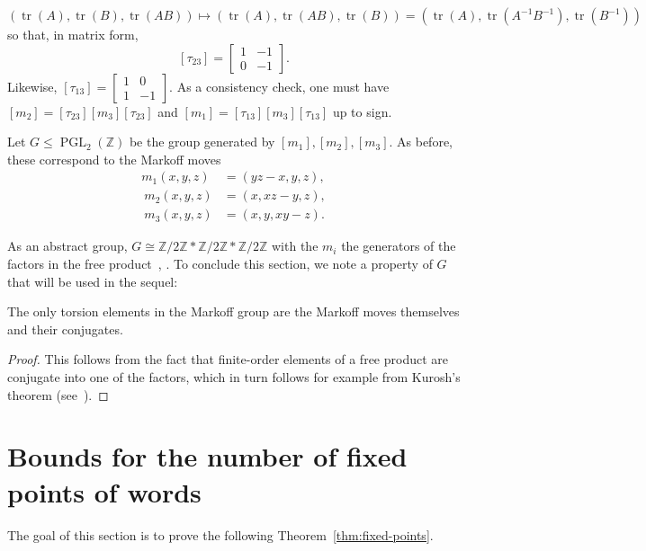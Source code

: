 \documentclass[AHL, Unicode, longabstracts, published]{cedram}
\newcommand{\Z}{\mathbb{Z}}
\DeclareMathOperator{\tr}{tr}
\DeclareMathOperator{\PGL}{PGL}
\newcommand{\Z}{\mathbb{Z}}
\begin{document}
\[
(\tr(A),\tr(B),\tr(AB)) \mapsto (\tr(A), \tr(AB), \tr(B)) = \left(\tr(A), \tr\left(A^{-1}B^{-1}\right), \tr\left(B^{-1}\right)\right)
\]
so that, in matrix form,
\[
[\tau_{23}] =
\begin{bmatrix} 1 & -1 \\ 0 & -1
\end{bmatrix}.
\]
Likewise, $[\tau_{13}] =\left[
\begin{smallmatrix} 1 & 0 \\ 1 & -1
\end{smallmatrix}\right]$. As a consistency check, one must have $[m_2] = [\tau_{23}][m_3][\tau_{23}]$ and $[m_1] = [\tau_{13}][m_3][\tau_{13}]$ up to sign.



Let $G \leq \PGL_{2}(\Z)$ be the group generated by $[m_1],[m_2],[m_3]$. As before, these correspond to the Markoff moves
\begin{equation}
\begin{aligned}
m_{1}(x,y,z)&=(yz-x,y,z),\\
\:m_{2}(x,y,z)&=(x,xz-y,z),\\
\:m_{3}(x,y,z)&=(x,y,xy-z).
\end{aligned}
\end{equation}


As an abstract group, $G\cong\Z/2\Z*\Z/2\Z*\Z/2\Z$ with the $m_{i}$ the generators of the factors in the free product~\cite[Theorem~1]{EH}, \cite[Theorem~3.1]{CL}. To conclude this section, we note a property of $G$ that will be used in the sequel:

\begin{lemm}\label{lem:The-only-torsion}
The only torsion elements in the Markoff group are the Markoff moves themselves and their conjugates.
\end{lemm}
\begin{proof}
This follows from the fact that finite-order elements of a free product are conjugate into one of the factors, which in turn follows for example from Kurosh's theorem (see~\cite[Corollary~4.9.1]{MKS}).
\end{proof}


\section{Bounds for the number of fixed points of words} \label{sec:gl2-fixed}

The goal of this section is to prove the following Theorem~\ref{thm:fixed-points}.
\end{document}
